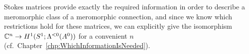 Stokes matrices provide exactly the required information in order to describe a
meromorphic class of a meromorphic connection, and since we know which
restrictions hold for these matrices, we can explicitly give the isomorphism
$\mathbb{C}^n\to H^1(S^1;\Lambda^{<0}(A^0))$ for a convenient $n$
(cf.\ Chapter~\ref{chp:WhichInformationIsNeeded}).

\begin{comment}
  \begin{enumerate}
    \item first introduce asymptotic analysis
    \item then define languages for meromorphic connections or systems
    \item talk about Stokes structures
    \item more?
  \end{enumerate}
\end{comment}

